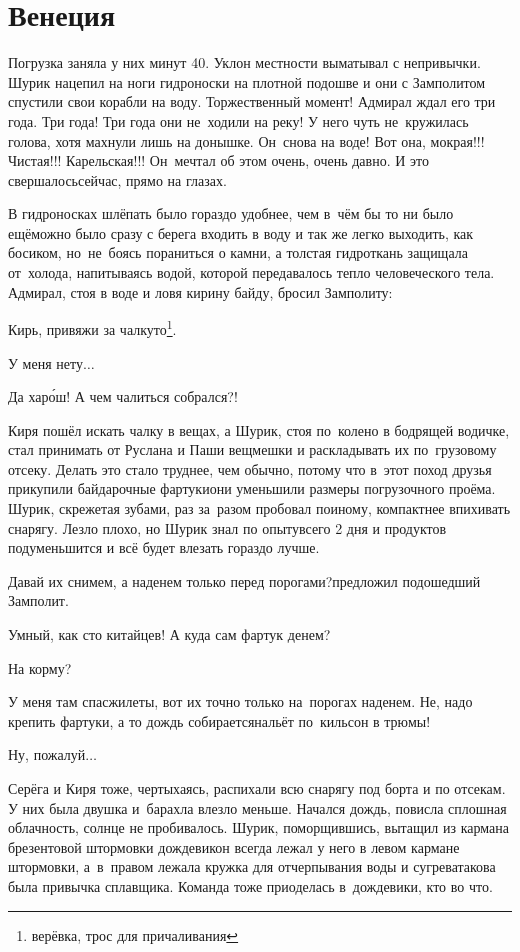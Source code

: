 \chapter{Венеция}
\vepsianrose

Погрузка заняла у них минут 40. Уклон местности выматывал с непривычки. Шурик нацепил на ноги гидроноски на плотной подошве и они с Замполитом спустили свои корабли на воду. Торжественный момент! Адмирал ждал его три года. Три года! Три года они не~ходили на реку! У него чуть не~кружилась голова, хотя махнули лишь на донышке. Он~снова на воде! Вот она, мокрая!!! Чистая!!! Карельская!!! Он~мечтал об этом очень, очень давно. И это свершалось\mdash сейчас, прямо на глазах.

В гидроносках шлёпать было гораздо удобнее, чем в~чём бы то ни было ещё\mdash можно было сразу с берега входить в воду и так же легко выходить, как босиком, но~не~боясь пораниться о камни, а толстая гидроткань защищала от~холода, напитываясь водой, которой передавалось тепло человеческого тела. Адмирал, стоя в воде и ловя кирину байду, бросил Замполиту:

\diagdash Кирь, привяжи за чалку\sdash то\footnote{верёвка, трос для причаливания}.

\diagdash У меня нету$\ldots$

\diagdash Да хар\'{о}ш! А чем чалиться собрался?!

Киря пошёл искать чалку в вещах, а Шурик, стоя по~колено в бодрящей водичке, стал принимать от Руслана и Паши вещмешки и раскладывать их по~грузовому отсеку. Делать это стало труднее, чем обычно, потому что в~этот поход друзья прикупили байдарочные фартуки\mdash они уменьшили размеры погрузочного проёма. Шурик, скрежетая зубами, раз за~разом пробовал по\sdash иному, компактнее впихивать снарягу. Лезло плохо, но Шурик знал по опыту\mdash всего 2 дня и продуктов подуменьшится и всё будет влезать гораздо лучше.

\diagdash Давай их снимем, а наденем только перед порогами?\mdash предложил подошедший Замполит. 

\diagdash Умный, как сто китайцев! А куда сам фартук денем? 

\diagdash На корму?

\diagdash У меня там спасжилеты, вот их точно только на~порогах наденем. Не, надо крепить фартуки, а то дождь собирается\mdash нальёт по~кильсон в трюмы!

\diagdash Ну, пожалуй$\ldots$

Серёга и Киря тоже, чертыхаясь, распихали всю снарягу под борта и по отсекам. У них была двушка и~барахла влезло меньше. Начался дождь, повисла сплошная облачность, солнце не пробивалось. Шурик, поморщившись, вытащил из кармана брезентовой штормовки дождевик\mdash он всегда лежал у него в левом кармане штормовки, а~в~правом лежала кружка для отчерпывания воды и сугрева\mdash такова была привычка сплавщика. Команда тоже приоделась в~дождевики, кто во что.

